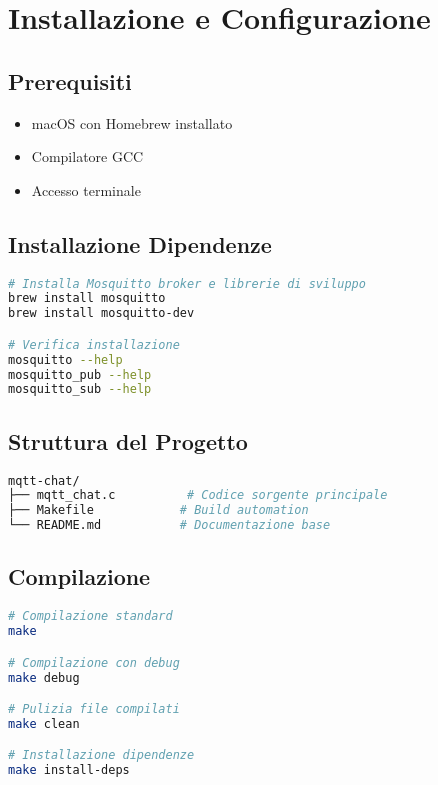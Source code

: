 \documentclass[12pt,a4paper]{article}
\begin{document}
\section{Installazione e Configurazione}

\subsection{Prerequisiti}

\begin{itemize}
    \item macOS con Homebrew installato
    \item Compilatore GCC
    \item Accesso terminale
\end{itemize}

\subsection{Installazione Dipendenze}

\begin{lstlisting}[language=bash, caption=Installazione Mosquitto]
# Installa Mosquitto broker e librerie di sviluppo
brew install mosquitto
brew install mosquitto-dev

# Verifica installazione
mosquitto --help
mosquitto_pub --help
mosquitto_sub --help
\end{lstlisting}

\subsection{Struttura del Progetto}

\begin{lstlisting}[language=bash, caption=Struttura Directory]
mqtt-chat/
├── mqtt_chat.c          # Codice sorgente principale
├── Makefile            # Build automation
└── README.md           # Documentazione base
\end{lstlisting}

\subsection{Compilazione}

\begin{lstlisting}[language=bash, caption=Comandi di Build]
# Compilazione standard
make

# Compilazione con debug
make debug

# Pulizia file compilati
make clean

# Installazione dipendenze
make install-deps
\end{lstlisting}
\end{document}

